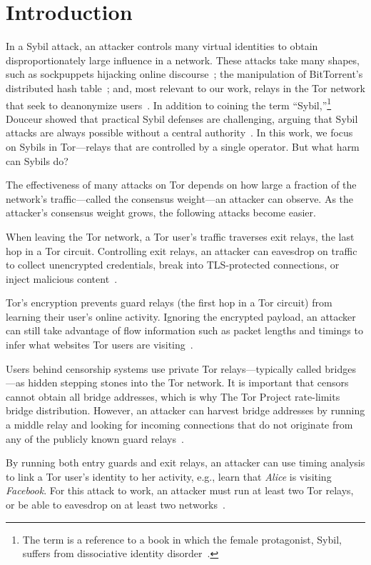 \section{Introduction}
\label{sec:introduction}
In a Sybil attack, an attacker controls many virtual identities to obtain
disproportionately large influence in a network.  These attacks take many
shapes, such as sockpuppets hijacking online discourse~\cite{Thomas2012a}; the
manipulation of BitTorrent's distributed hash table~\cite{Wang2012a}; and, most
relevant to our work, relays in the Tor network that seek to deanonymize
users~\cite{cmucert}.  In addition to coining the term ``Sybil,''\footnote{The
term is a reference to a book in which the female protagonist, Sybil, suffers
from dissociative identity disorder~\cite{Schreiber1973}.} Douceur showed that
practical Sybil defenses are challenging, arguing that Sybil attacks are always
possible without a central authority~\cite{Douceur2002a}.  In this work, we
focus on Sybils in Tor---relays that are controlled by a single operator.  But
what harm can Sybils do?

The effectiveness of many attacks on Tor depends on how large a fraction of the
network's traffic---called the consensus weight---an attacker can observe.  As
the attacker's consensus weight grows, the following attacks become easier.

\begin{description}[noitemsep]
	\item[Exit traffic tampering:] When leaving the Tor network, a Tor user's
		traffic traverses exit relays, the last hop in a Tor circuit.
		Controlling exit relays, an attacker can eavesdrop on traffic to collect
		unencrypted credentials, break into TLS-protected connections, or inject
		malicious content~\cite[\S~5.2]{Winter2014a}.
	\item[Website fingerprinting:] Tor's encryption prevents guard relays (the
		first hop in a Tor circuit) from learning their user's online activity.
		Ignoring the encrypted payload, an attacker can still take advantage of
		flow information such as packet lengths and timings to infer what
		websites Tor users are visiting~\cite{Juarez2014a}.
	\item[Bridge address harvesting:] Users behind censorship systems use
		private Tor relays---typically called bridges---as hidden stepping
		stones into the Tor network.  It is important that censors cannot obtain
		all bridge addresses, which is why The Tor Project rate-limits bridge
		distribution.  However, an attacker can harvest bridge addresses by
		running a middle relay and looking for incoming connections that do not
		originate from any of the publicly known guard
		relays~\cite[\S~3.4]{Ling2015b}.
	\item[End-to-end correlation:] By running both entry guards and exit relays,
		an attacker can use timing analysis to link a Tor user's identity to her
		activity, e.g., learn that \emph{Alice} is visiting \emph{Facebook}.
		For this attack to work, an attacker must run at least two Tor relays,
		or be able to eavesdrop on at least two networks~\cite{Johnson2013a}.
\end{description}

